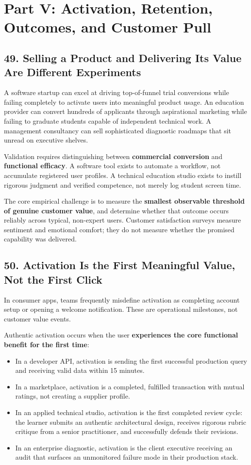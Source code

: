 \section*{Part V: Activation, Retention, Outcomes, and Customer Pull}

\subsection*{49. Selling a Product and Delivering Its Value Are Different Experiments}

A software startup can excel at driving top-of-funnel trial conversions while failing completely to activate users into meaningful product usage. An education provider can convert hundreds of applicants through aspirational marketing while failing to graduate students capable of independent technical work. A management consultancy can sell sophisticated diagnostic roadmaps that sit unread on executive shelves.

Validation requires distinguishing between \textbf{commercial conversion} and \textbf{functional efficacy}. A software tool exists to automate a workflow, not accumulate registered user profiles. A technical education studio exists to instill rigorous judgment and verified competence, not merely log student screen time.

The core empirical challenge is to measure the \textbf{smallest observable threshold of genuine customer value}, and determine whether that outcome occurs reliably across typical, non-expert users. Customer satisfaction surveys measure sentiment and emotional comfort; they do not measure whether the promised capability was delivered.

\subsection*{50. Activation Is the First Meaningful Value, Not the First Click}

In consumer apps, teams frequently misdefine activation as completing account setup or opening a welcome notification. These are operational milestones, not customer value events.

Authentic activation occurs when the user \textbf{experiences the core functional benefit for the first time}:
\begin{itemize}
    \item In a developer API, activation is sending the first successful production query and receiving valid data within 15 minutes.
    \item In a marketplace, activation is a completed, fulfilled transaction with mutual ratings, not creating a supplier profile.
    \item In an applied technical studio, activation is the first completed review cycle: the learner submits an authentic architectural design, receives rigorous rubric critique from a senior practitioner, and successfully defends their revisions.
    \item In an enterprise diagnostic, activation is the client executive receiving an audit that surfaces an unmonitored failure mode in their production stack.
\end{itemize}

